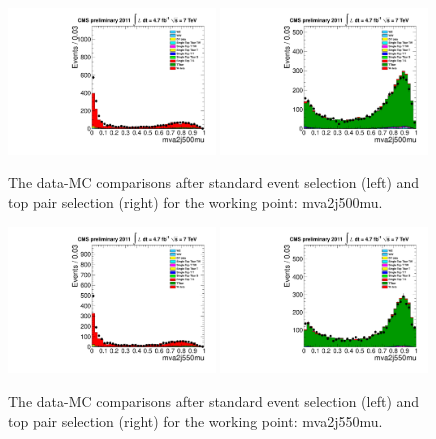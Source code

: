 \begin{figure}[!t]
  \centering
  \includegraphics[width=0.49\textwidth]{figs/cl-mva2j500mu-normal.pdf}
  \includegraphics[width=0.49\textwidth]{figs/cl-mva2j500mu-inTTbar.pdf}
  \caption{\label{fig:mva:plots-mva2j500mu} The data-MC comparisons
    after standard event selection (left) and top pair
    selection (right) for the working point: mva2j500mu.}
\end{figure}

\begin{figure}[!t]
  \centering
  \includegraphics[width=0.49\textwidth]{figs/cl-mva2j550mu-normal.pdf}
  \includegraphics[width=0.49\textwidth]{figs/cl-mva2j550mu-inTTbar.pdf}
  \caption{\label{fig:mva:plots-mva2j550mu} The data-MC comparisons
    after standard event selection (left) and top pair
    selection (right) for the working point: mva2j550mu.}
\end{figure}


